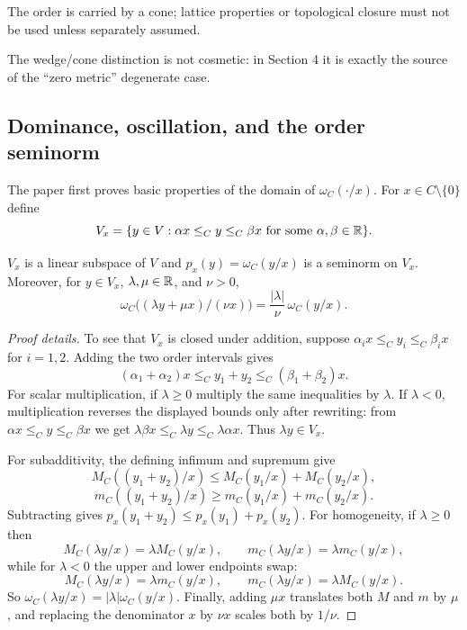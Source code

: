 \begin{commentarynotes}
\item The order is carried by a cone; lattice properties or topological closure must not be used unless separately assumed.
\item The wedge/cone distinction is not cosmetic: in Section 4 it is exactly the source of the ``zero metric'' degenerate case.
\end{commentarynotes}

\subsection{Dominance, oscillation, and the order seminorm}
The paper first proves basic properties of the domain of $\omega_C(\cdot/x)$.
For $x\in C\setminus\{0\}$ define
\[
  V_x=\{y\in V: \alpha x\le_C y\le_C\beta x\text{ for some }\alpha,\beta\in\mathbb{R}\}.
\]

\begin{lemma}
$V_x$ is a linear subspace of $V$ and $p_x(y)=\omega_C(y/x)$ is a seminorm on $V_x$.
Moreover, for $y\in V_x$, $\lambda,\mu\in\mathbb{R}$, and $\nu>0$,
\[
  \omega_C\!\big((\lambda y+\mu x)/(\nu x)\big)=\frac{|\lambda|}{\nu}\,\omega_C(y/x).
\]
\end{lemma}

\begin{proof}[Proof details]
To see that $V_x$ is closed under addition, suppose
$\alpha_i x\le_C y_i\le_C \beta_i x$ for $i=1,2$.
Adding the two order intervals gives
\[
  (\alpha_1+\alpha_2)x\le_C y_1+y_2\le_C (\beta_1+\beta_2)x.
\]
For scalar multiplication, if $\lambda\ge0$ multiply the same inequalities by $\lambda$.
If $\lambda<0$, multiplication reverses the displayed bounds only after rewriting: from $\alpha x\le_C y\le_C\beta x$ we get
$\lambda\beta x\le_C \lambda y\le_C\lambda\alpha x$.
Thus $\lambda y\in V_x$.

For subadditivity, the defining infimum and supremum give
\[
  M_C((y_1+y_2)/x)\le M_C(y_1/x)+M_C(y_2/x),
\]
\[
  m_C((y_1+y_2)/x)\ge m_C(y_1/x)+m_C(y_2/x).
\]
Subtracting gives $p_x(y_1+y_2)\le p_x(y_1)+p_x(y_2)$.
For homogeneity, if $\lambda\ge0$ then
\[
  M_C(\lambda y/x)=\lambda M_C(y/x),\qquad
  m_C(\lambda y/x)=\lambda m_C(y/x),
\]
while for $\lambda<0$ the upper and lower endpoints swap:
\[
  M_C(\lambda y/x)=\lambda m_C(y/x),\qquad
  m_C(\lambda y/x)=\lambda M_C(y/x).
\]
So $\omega_C(\lambda y/x)=|\lambda|\omega_C(y/x)$.
Finally, adding $\mu x$ translates both $M$ and $m$ by $\mu$, and replacing the denominator $x$ by $\nu x$ scales both by $1/\nu$.
\end{proof}

